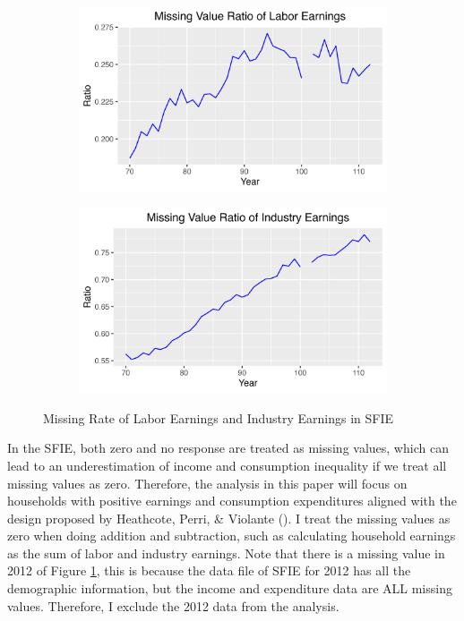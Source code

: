 \documentclass{article}
\begin{document}
\begin{figure}
    \centering
    \begin{subfigure}[t]{0.475\textwidth}
        \centering
        \includegraphics[width=\textwidth]{figures/missing/itm190.png}
    \end{subfigure}
    \begin{subfigure}[t]{0.475\textwidth}
        \centering
        \includegraphics[width=\textwidth]{figures/missing/itm240.png}
    \end{subfigure}
    \caption{Missing Rate of Labor Earnings and Industry Earnings in SFIE}
    \label{fig:missing}
\end{figure}
In the SFIE, both zero and no response are treated as missing values, which can lead to an underestimation of income and consumption inequality if we treat all missing values as zero.
Therefore, the analysis in this paper will focus on households with positive earnings and consumption expenditures aligned with the design proposed by Heathcote, Perri, \& Violante (\citeyear{HEATHCOTE_2010}).
I treat the missing values as zero when doing addition and subtraction, such as calculating household earnings as the sum of labor and industry earnings.
Note that there is a missing value in 2012 of Figure \ref{fig:missing}, this is because the data file of SFIE for 2012 has all the demographic information, but the income and expenditure data are ALL missing values.
Therefore, I exclude the 2012 data from the analysis.
\end{document}
